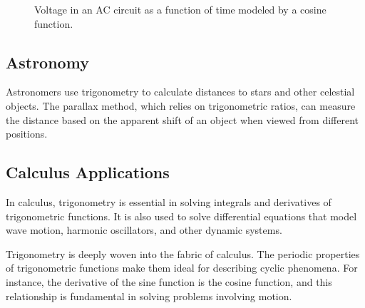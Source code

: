 \documentclass[a4paper,12pt]{book}
\newcounter{problem}
\begin{document}
\begin{figure}[h]
\centering
{}
\caption{Voltage in an AC circuit as a function of time modeled by a cosine function.}
\label{fig:ac_voltage}
\end{figure}

\subsection{Astronomy}
\label{subsec:astronomy}
Astronomers use trigonometry to calculate distances to stars and other celestial objects. The parallax method, which relies on trigonometric ratios, can measure the distance based on the apparent shift of an object when viewed from different positions.


\subsection{Calculus Applications}
\label{subsec:calculus_applications}
In calculus, trigonometry is essential in solving integrals and derivatives of trigonometric functions. It is also used to solve differential equations that model wave motion, harmonic oscillators, and other dynamic systems.


Trigonometry is deeply woven into the fabric of calculus. The periodic properties of trigonometric functions make them ideal for describing cyclic phenomena. For instance, the derivative of the sine function is the cosine function, and this relationship is fundamental in solving problems involving motion.
\end{document}
